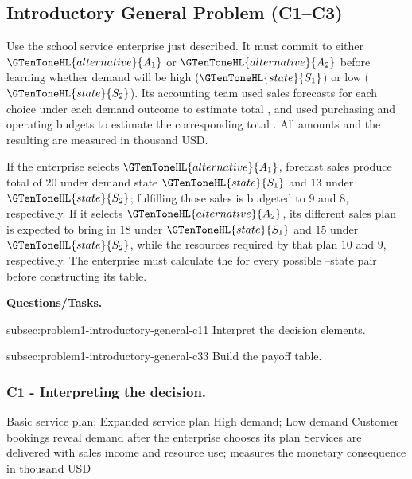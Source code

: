 \subsection{Introductory General Problem (C1--C3)}
	\label{sec:problem1-introductory-general-c1-c3}

	Use the school service enterprise just described. It must commit to either  \(\GTenToneHL{alternative}{A_1}\) or  \(\GTenToneHL{alternative}{A_2}\) before learning whether demand will be high (\(\GTenToneHL{state}{S_1}\)) or low (\(\GTenToneHL{state}{S_2}\)). Its accounting team used sales forecasts for each choice under each demand outcome to estimate total , and used purchasing and operating budgets to estimate the corresponding total . All amounts and the resulting  are measured in thousand USD.

	If the enterprise selects \(\GTenToneHL{alternative}{A_1}\), forecast sales produce total  of \(20\) under demand state \(\GTenToneHL{state}{S_1}\) and \(13\) under \(\GTenToneHL{state}{S_2}\); fulfilling those sales is budgeted to  \(9\) and \(8\), respectively. If it selects \(\GTenToneHL{alternative}{A_2}\), its different sales plan is expected to bring in \(18\) under \(\GTenToneHL{state}{S_1}\) and \(15\) under \(\GTenToneHL{state}{S_2}\), while the resources required by that plan  \(10\) and \(9\), respectively. The enterprise must calculate the  for every possible --state pair before constructing its  table.

	\textbf{Questions/Tasks.}
	\begin{enumerate}
		\CriterionTask
		{subsec:problem1-introductory-general-c1}{1}
		{Interpret the decision elements.}

		\CriterionTask
		{subsec:problem1-introductory-general-c3}{3}
		{Build the payoff table.}
	\end{enumerate}

	\subsubsection*{C1 - Interpreting the decision.}
	\label{subsec:problem1-introductory-general-c1}

	\DecisionElementsTable
	{Basic service plan; Expanded service plan}
	{High demand; Low demand}
	{Customer bookings reveal demand after the enterprise chooses its plan}
	{Services are delivered with sales income and resource use;  measures the monetary consequence in thousand USD}

